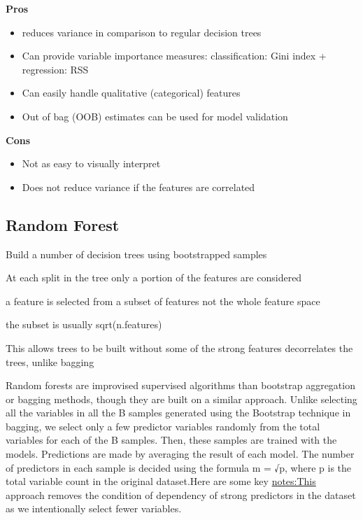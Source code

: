 \documentclass[]{book}
\begin{document}
\textbf{Pros}

\begin{itemize}
\item
  reduces variance in comparison to regular decision trees
\item
  Can provide variable importance measures: classification: Gini index + regression: RSS
\item
  Can easily handle qualitative (categorical) features
\item
  Out of bag (OOB) estimates can be used for model validation
\end{itemize}

\textbf{Cons}

\begin{itemize}
\item
  Not as easy to visually interpret
\item
  Does not reduce variance if the features are correlated
\end{itemize}

\hypertarget{random-forest}{%
\subsection{Random Forest}\label{random-forest}}

Build a number of decision trees using bootstrapped samples

At each split in the tree only a portion of the features are considered

a feature is selected from a subset of features not the whole feature space

the subset is usually sqrt(n.features)

This allows trees to be built without some of the strong features decorrelates the trees, unlike bagging

Random forests are improvised supervised algorithms than bootstrap aggregation or bagging methods, though they are built on a similar approach. Unlike selecting all the variables in all the B samples generated using the Bootstrap technique in bagging, we select only a few predictor variables randomly from the total variables for each of the B samples. Then, these samples are trained with the models. Predictions are made by averaging the result of each model. The number of predictors in each sample is decided using the formula m = √p, where p is the total variable count in the original dataset.Here are some key \url{notes:This} approach removes the condition of dependency of strong predictors in the dataset as we intentionally select fewer variables.
\end{document}
